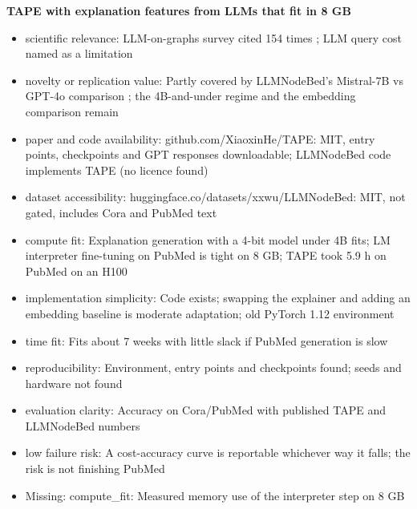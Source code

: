 \documentclass[11pt,a4paper]{article}
\begin{document}
\textbf{TAPE with explanation features from LLMs that fit in 8 GB}
\begin{itemize}
\item scientific relevance: LLM-on-graphs survey cited 154 times \cite{jin2024llmgraphs}; LLM query cost named as a limitation \cite{chen2024exploring}
\item novelty or replication value: Partly covered by LLMNodeBed's Mistral-7B vs GPT-4o comparison \cite{wu2025llmnodebed}; the 4B-and-under regime and the embedding comparison remain
\item paper and code availability: github.com/XiaoxinHe/TAPE: MIT, entry points, checkpoints and GPT responses downloadable; LLMNodeBed code implements TAPE (no licence found)
\item dataset accessibility: huggingface.co/datasets/xxwu/LLMNodeBed: MIT, not gated, includes Cora and PubMed text
\item compute fit: Explanation generation with a 4-bit model under 4B fits; LM interpreter fine-tuning on PubMed is tight on 8 GB; TAPE took 5.9 h on PubMed on an H100 \cite{wu2025llmnodebed}
\item implementation simplicity: Code exists; swapping the explainer and adding an embedding baseline is moderate adaptation; old PyTorch 1.12 environment
\item time fit: Fits about 7 weeks with little slack if PubMed generation is slow
\item reproducibility: Environment, entry points and checkpoints found; seeds and hardware not found
\item evaluation clarity: Accuracy on Cora/PubMed with published TAPE and LLMNodeBed numbers
\item low failure risk: A cost-accuracy curve is reportable whichever way it falls; the risk is not finishing PubMed
\item Missing: compute\_fit: Measured memory use of the interpreter step on 8 GB
\end{itemize}
\end{document}
